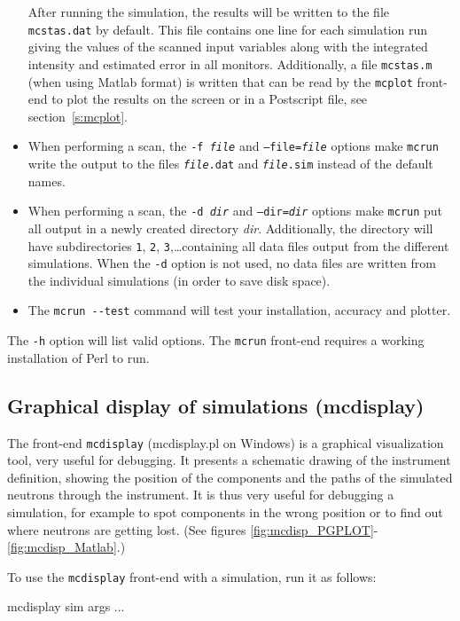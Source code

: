 \begin{itemize}
After running the simulation, the results will be written to the file
\verb+mcstas.dat+ by default. This file contains one line for each simulation
run giving the values of the scanned input variables along with the integrated
intensity and estimated error in all monitors. Additionally, a file
\verb+mcstas.m+ (when using Matlab format) is written that can be read by the
\verb+mcplot+ front-end to plot the results on the screen or in a Postscript
file, see section~\ref{s:mcplot}. 
\item When performing a scan, the \texttt{-f {\it file}} and
  \texttt{--file={\it file}} options make \verb+mcrun+ write the output
  to the files \texttt{{\it file\/}.dat} and \texttt{{\it file\/}.sim}
  instead of the default names.
\item When performing a scan, the \texttt{-d {\it dir}} and
  \texttt{--dir={\it dir}} options make \verb+mcrun+ put all output in a
  newly created directory \textit{dir}. Additionally, the directory will
  have subdirectories \verb+1+, \verb+2+, \verb+3+,\ldots containing all
  data files output from the different simulations. When the \verb+-d+
  option is not used, no data files are written from the individual
  simulations (in order to save disk space).
\item The \verb+mcrun --test+ command will test your \MCS installation,
  accuracy and plotter. 
\end{itemize}

The \verb+-h+ option will list valid options. The \verb+mcrun+ front-end
requires a working installation of Perl to run.


\subsection{Graphical display of simulations (mcdisplay)}
\label{s:mcdisplay}

The front-end \verb+mcdisplay+ (mcdisplay.pl on Windows) is a graphical
visualization tool, very useful for debugging.  It presents a schematic drawing
of the instrument definition, showing the position of the components and the
paths of the simulated neutrons through the instrument. It is thus very useful
for debugging a simulation, for example to spot components in the wrong position
or to find out where neutrons are getting lost.  (See figures
\ref{fig:mcdisp_PGPLOT}-\ref{fig:mcdisp_Matlab}.)

To use the \verb+mcdisplay+ front-end with a simulation, run it as
follows:
\begin{bash}
mcdisplay sim args ...
\end{bash}

